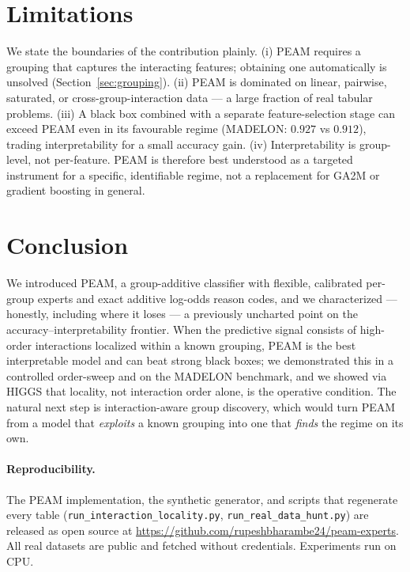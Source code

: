 \documentclass{article}
\begin{document}
\section{Limitations}
\label{sec:limits}

We state the boundaries of the contribution plainly. (i) PEAM requires a grouping
that captures the interacting features; obtaining one automatically is unsolved
(Section~\ref{sec:grouping}). (ii) PEAM is dominated on linear, pairwise,
saturated, or cross-group-interaction data --- a large fraction of real tabular
problems. (iii) A black box combined with a separate feature-selection stage can
exceed PEAM even in its favourable regime (MADELON: $0.927$ vs $0.912$), trading
interpretability for a small accuracy gain. (iv) Interpretability is group-level,
not per-feature. PEAM is therefore best understood as a targeted instrument for a
specific, identifiable regime, not a replacement for GA2M or gradient boosting in
general.

\section{Conclusion}

We introduced PEAM, a group-additive classifier with flexible, calibrated
per-group experts and exact additive log-odds reason codes, and we characterized
--- honestly, including where it loses --- a previously uncharted point on the
accuracy--interpretability frontier. When the predictive signal consists of
high-order interactions localized within a known grouping, PEAM is the best
interpretable model and can beat strong black boxes; we demonstrated this in a
controlled order-sweep and on the MADELON benchmark, and we showed via HIGGS that
locality, not interaction order alone, is the operative condition. The natural
next step is interaction-aware group discovery, which would turn PEAM from a
model that \emph{exploits} a known grouping into one that \emph{finds} the regime
on its own.

\paragraph{Reproducibility.} The PEAM implementation, the synthetic generator,
and scripts that regenerate every table (\texttt{run\_interaction\_locality.py},
\texttt{run\_real\_data\_hunt.py}) are released as open source at
\url{https://github.com/rupeshbharambe24/peam-experts}. All real datasets are
public and fetched without credentials. Experiments run on CPU.

\small


\end{document}
